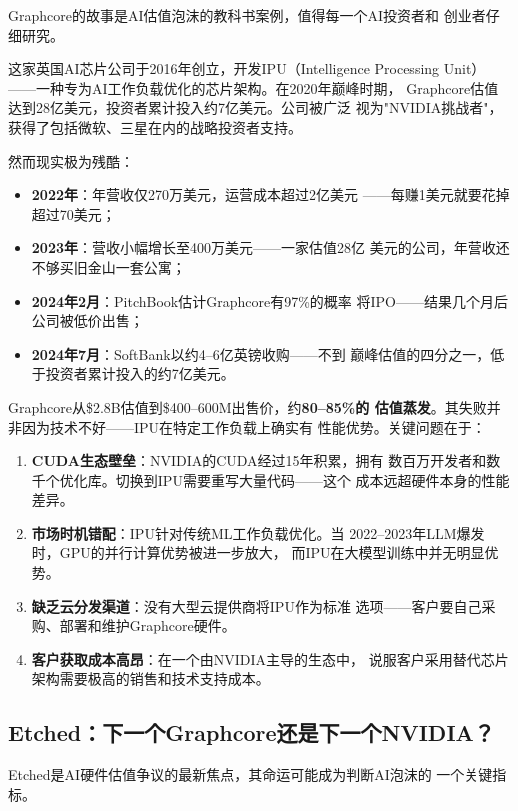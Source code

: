 Graphcore的故事是AI估值泡沫的教科书案例，值得每一个AI投资者和
创业者仔细研究。

这家英国AI芯片公司于2016年创立，开发IPU（Intelligence Processing
Unit）——一种专为AI工作负载优化的芯片架构。在2020年巅峰时期，
Graphcore估值达到28亿美元，投资者累计投入约7亿美元。公司被广泛
视为"NVIDIA挑战者"，获得了包括微软、三星在内的战略投资者支持。

然而现实极为残酷：
\begin{itemize}
  \item \textbf{2022年}：年营收仅270万美元，运营成本超过2亿美元
    ——每赚1美元就要花掉超过70美元；
  \item \textbf{2023年}：营收小幅增长至400万美元——一家估值28亿
    美元的公司，年营收还不够买旧金山一套公寓；
  \item \textbf{2024年2月}：PitchBook估计Graphcore有97\%的概率
    将IPO——结果几个月后公司被低价出售；
  \item \textbf{2024年7月}：SoftBank以约4--6亿英镑收购——不到
    巅峰估值的四分之一，低于投资者累计投入的约7亿美元。
\end{itemize}

Graphcore从\$2.8B估值到\$400--600M出售价，约\textbf{80--85\%的
估值蒸发}。其失败并非因为技术不好——IPU在特定工作负载上确实有
性能优势。关键问题在于：

\begin{enumerate}
  \item \textbf{CUDA生态壁垒}：NVIDIA的CUDA经过15年积累，拥有
    数百万开发者和数千个优化库。切换到IPU需要重写大量代码——这个
    成本远超硬件本身的性能差异。
  \item \textbf{市场时机错配}：IPU针对传统ML工作负载优化。当
    2022--2023年LLM爆发时，GPU的并行计算优势被进一步放大，
    而IPU在大模型训练中并无明显优势。
  \item \textbf{缺乏云分发渠道}：没有大型云提供商将IPU作为标准
    选项——客户要自己采购、部署和维护Graphcore硬件。
  \item \textbf{客户获取成本高昂}：在一个由NVIDIA主导的生态中，
    说服客户采用替代芯片架构需要极高的销售和技术支持成本。
\end{enumerate}

\subsection{Etched：下一个Graphcore还是下一个NVIDIA？}
\label{subsec:fund-etched}

Etched是AI硬件估值争议的最新焦点，其命运可能成为判断AI泡沫的
一个关键指标。

